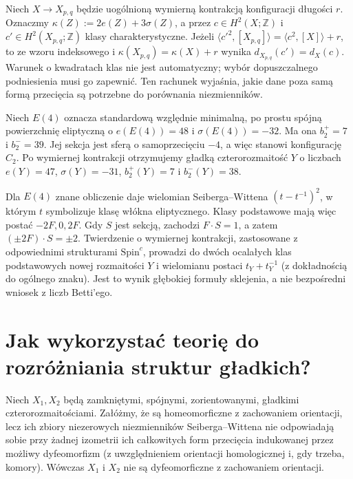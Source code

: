 \begin{przyklad}
Niech $X\to X_{p,q}$ będzie uogólnioną wymierną kontrakcją
konfiguracji długości $r$. Oznaczmy
$\kappa(Z):=2e(Z)+3\sigma(Z)$, a przez
$c\in H^2(X;\mathbb Z)$ i $c'\in H^2(X_{p,q};\mathbb Z)$
klasy charakterystyczne. Jeżeli
$\langle c'^2,[X_{p,q}]\rangle
=\langle c^2,[X]\rangle+r$, to ze wzoru indeksowego i
$\kappa(X_{p,q})=\kappa(X)+r$ wynika
$d_{X_{p,q}}(c')=d_X(c)$.
Warunek o kwadratach klas nie jest automatyczny;
wybór dopuszczalnego podniesienia musi go zapewnić.
Ten rachunek wyjaśnia, jakie dane poza samą formą
przecięcia są potrzebne do porównania niezmienników.
\end{przyklad}

\begin{przyklad}
Niech $E(4)$ oznacza standardową względnie minimalną,
po prostu spójną powierzchnię eliptyczną o
$e(E(4))=48$ i $\sigma(E(4))=-32$.
Ma ona $b_2^+=7$ i $b_2^-=39$.
Jej sekcja jest sferą o samoprzecięciu $-4$,
a więc stanowi konfigurację $C_2$. Po wymiernej
kontrakcji otrzymujemy gładką czterorozmaitość $Y$
o liczbach $e(Y)=47$, $\sigma(Y)=-31$,
$b_2^+(Y)=7$ i $b_2^-(Y)=38$.

Dla $E(4)$ znane obliczenie daje wielomian
Seiberga--Wittena $(t-t^{-1})^2$, w którym
$t$ symbolizuje klasę włókna eliptycznego.
Klasy podstawowe mają więc postać $-2F,0,2F$.
Gdy $S$ jest sekcją, zachodzi $F\cdot S=1$,
a zatem $(\pm2F)\cdot S=\pm2$.
Twierdzenie o wymiernej kontrakcji, zastosowane
z odpowiednimi strukturami $\mathrm{Spin}^c$,
prowadzi do dwóch ocalałych klas podstawowych
nowej rozmaitości $Y$ i wielomianu postaci
$t_Y+t_Y^{-1}$ (z dokładnością do ogólnego znaku).
Jest to wynik głębokiej formuły sklejenia, a nie
bezpośredni wniosek z liczb Betti'ego.
\end{przyklad}

\section{Jak wykorzystać teorię do rozróżniania struktur gładkich?}
\label{sec:tg-sw-exotic}

\begin{stwierdzenie}
Niech $X_1,X_2$ będą zamkniętymi, spójnymi,
zorientowanymi, gładkimi czterorozmaitościami.
Załóżmy, że są homeomorficzne z zachowaniem orientacji,
lecz ich zbiory niezerowych niezmienników
Seiberga--Wittena nie odpowiadają sobie przy żadnej
izometrii ich całkowitych form przecięcia indukowanej
przez możliwy dyfeomorfizm (z uwzględnieniem orientacji
homologicznej i, gdy trzeba, komory). Wówczas $X_1$
i $X_2$ nie są dyfeomorficzne z zachowaniem orientacji.
\end{stwierdzenie}

